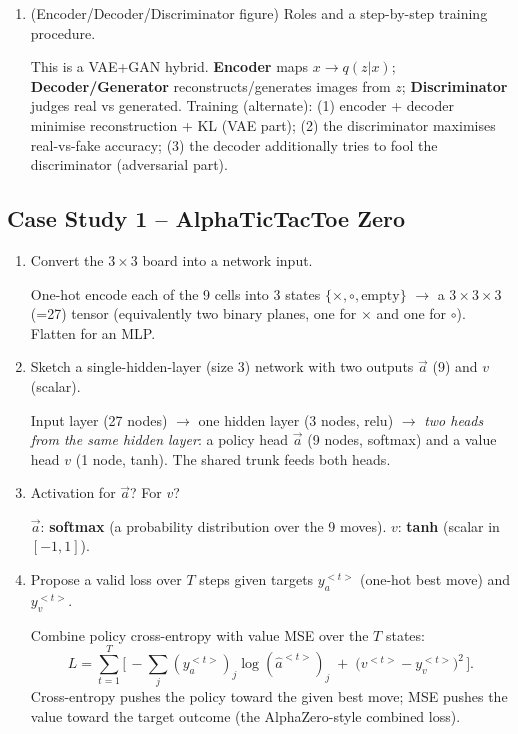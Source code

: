 \documentclass[10pt,a4paper]{article}
\newcommand{\q}[1]{\item #1}
\begin{document}
\begin{enumerate}[leftmargin=*,label=\textbf{Q\arabic*.}]
\q (Encoder/Decoder/Discriminator figure) Roles and a step-by-step training procedure.
\begin{answerbox}
This is a VAE+GAN hybrid. \textbf{Encoder} maps $x\to q(z|x)$; \textbf{Decoder/Generator} reconstructs/generates images from $z$; \textbf{Discriminator} judges real vs generated. Training (alternate): (1) encoder + decoder minimise reconstruction + KL (VAE part); (2) the discriminator maximises real-vs-fake accuracy; (3) the decoder additionally tries to fool the discriminator (adversarial part).
\end{answerbox}

\end{enumerate}

\subsection{Case Study 1 -- AlphaTicTacToe Zero}

\begin{enumerate}[leftmargin=*,label=\textbf{(\alph*)}]

\q Convert the $3\times3$ board into a network input.
\begin{answerbox}
One-hot encode each of the 9 cells into 3 states $\{\times, \circ, \text{empty}\}$ $\to$ a $3\times3\times3$ (=27) tensor (equivalently two binary planes, one for $\times$ and one for $\circ$). Flatten for an MLP.
\end{answerbox}

\q Sketch a single-hidden-layer (size 3) network with two outputs $\vec a$ (9) and $v$ (scalar).
\begin{answerbox}
Input layer (27 nodes) $\to$ one hidden layer (3 nodes, relu) $\to$ \emph{two heads from the same hidden layer}: a policy head $\vec a$ (9 nodes, softmax) and a value head $v$ (1 node, tanh). The shared trunk feeds both heads.
\end{answerbox}

\q Activation for $\vec a$? For $v$?
\begin{answerbox}
$\vec a$: \textbf{softmax} (a probability distribution over the 9 moves). $v$: \textbf{tanh} (scalar in $[-1,1]$).
\end{answerbox}

\q Propose a valid loss over $T$ steps given targets $y_a^{<t>}$ (one-hot best move) and $y_v^{<t>}$.
\begin{answerbox}
Combine policy cross-entropy with value MSE over the $T$ states:
\[ L = \sum_{t=1}^{T}\Big[\,-\!\sum_j (y_a^{<t>})_j \log (\hat a^{<t>})_j \;+\; \big(v^{<t>}-y_v^{<t>}\big)^2\,\Big]. \]
Cross-entropy pushes the policy toward the given best move; MSE pushes the value toward the target outcome (the AlphaZero-style combined loss).
\end{answerbox}

\end{enumerate}
\end{document}
